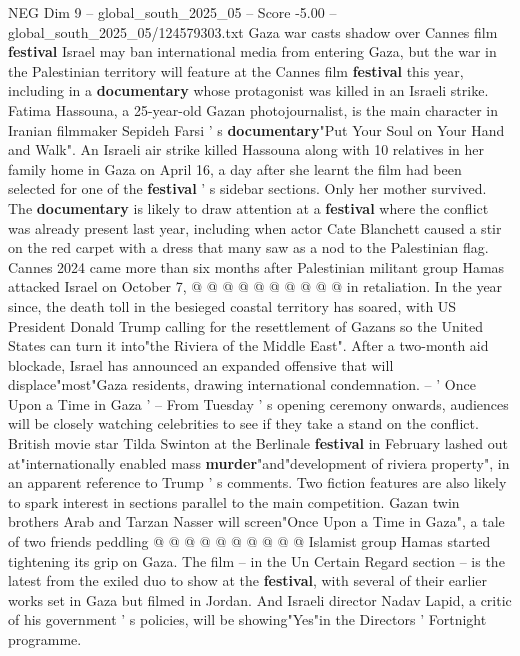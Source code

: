 \begin{textsample}{NEG Dim 9 – global\_south\_2025\_05 – Score -5.00 – global\_south\_2025\_05/124579303.txt}  \label{ex:f9_neg_228}
Gaza war casts shadow over Cannes film \textbf{festival} Israel may ban international media from entering Gaza, but the war in the Palestinian territory will feature at the Cannes film \textbf{festival} this year, including in a \textbf{documentary} whose protagonist was killed in an Israeli strike.
Fatima Hassouna, a 25-year-old Gazan photojournalist, is the main character in Iranian filmmaker Sepideh Farsi ' s \textbf{documentary}"Put Your Soul on Your Hand and Walk".
An Israeli air strike killed Hassouna along with 10 relatives in her family home in Gaza on April 16, a day after she learnt the film had been selected for one of the \textbf{festival} ' s sidebar sections.
Only her mother survived.
The \textbf{documentary} is likely to draw attention at a \textbf{festival} where the conflict was already present last year, including when actor Cate Blanchett caused a stir on the red carpet with a dress that many saw as a nod to the Palestinian flag.
Cannes 2024 came more than six months after Palestinian militant group Hamas attacked Israel on October 7, @ @ @ @ @ @ @ @ @ @ in retaliation.
In the year since, the death toll in the besieged coastal territory has soared, with US President Donald Trump calling for the resettlement of Gazans so the United States can turn it into"the Riviera of the Middle East".
After a two-month aid blockade, Israel has announced an expanded offensive that will displace"most"Gaza residents, drawing international condemnation. -- ' Once Upon a Time in Gaza ' -- From Tuesday ' s opening ceremony onwards, audiences will be closely watching celebrities to see if they take a stand on the conflict.
British movie star Tilda Swinton at the Berlinale \textbf{festival} in February lashed out at"internationally enabled mass \textbf{murder}"and"development of riviera property", in an apparent reference to Trump ' s comments.
Two fiction features are also likely to spark interest in sections parallel to the main competition.
Gazan twin brothers Arab and Tarzan Nasser will screen"Once Upon a Time in Gaza", a tale of two friends peddling @ @ @ @ @ @ @ @ @ @ Islamist group Hamas started tightening its grip on Gaza.
The film -- in the Un Certain Regard section -- is the latest from the exiled duo to show at the \textbf{festival}, with several of their earlier works set in Gaza but filmed in Jordan.
And Israeli director Nadav Lapid, a critic of his government ' s policies, will be showing"Yes"in the Directors ' Fortnight programme.

\end{textsample}
